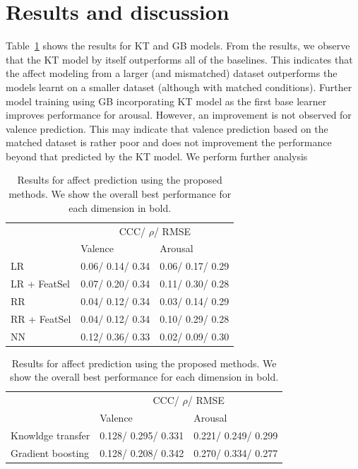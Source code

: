 \documentclass{article}
\begin{document}
\section{Results and discussion}
Table~\ref{} shows the results for KT and GB models.
From the results, we observe that the KT model by itself outperforms all of the baselines.
This indicates that the affect modeling from a larger (and mismatched) dataset outperforms the models learnt on a smaller dataset (although with matched conditions). 
Further model training using GB incorporating KT model as the first base learner improves performance for arousal. 
However, an improvement is not observed for valence prediction.
This may indicate that valence prediction based on the matched dataset is rather poor and does not improvement the performance beyond that predicted by the KT model.
We perform further analysis      
 



\begin{table}[t]
\centering
\caption{Results for affect prediction using the baseline regressors. The best performances for each dimension are shown in bold.}
\begin{tabular}{@{}l|l|l@{}}
\hline
				        & \multicolumn{2}{c}{CCC/ $\rho$/ RMSE}\\ \cline{2-3}
				        & Valence       & Arousal \\ \hline
LR           & 0.06/ 0.14/ 0.34 & 0.06/ 0.17/ 0.29 \\ 
LR + FeatSel & 0.07/ 0.20/ 0.34 & 0.11/ 0.30/ 0.28 \\ 
RR           & 0.04/ 0.12/ 0.34 & 0.03/ 0.14/ 0.29 \\ 
RR + FeatSel & 0.04/ 0.12/ 0.34 & 0.10/ 0.29/ 0.28 \\ 
NN           & 0.12/ 0.36/ 0.33 & 0.02/ 0.09/ 0.30 \\ 
\end{tabular}
\label{Baseline_table}
\caption{Results for affect prediction using the proposed methods. We show the overall best performance for each dimension in bold.} 
\begin{tabular}{@{}l|l|l@{}}
\hline
				        & \multicolumn{2}{c}{CCC/ $\rho$/ RMSE}\\ \cline{2-3}
				        & Valence       & Arousal \\ \hline
Knowldge transfer& 0.128/ 0.295/ 0.331 & 0.221/ 0.249/ 0.299 \\ 
Gradient boosting& 0.128/ 0.208/ 0.342 & 0.270/ 0.334/ 0.277 \\ 
\end{tabular}
\label{KT_table}
\end{table}
\end{document}
